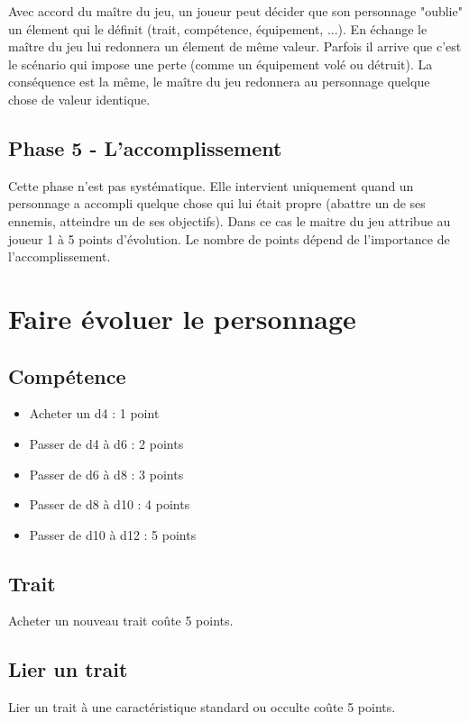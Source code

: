 \begin{multicols}{2}
Avec accord du maître du jeu, un joueur peut décider que son personnage "oublie" un élement qui le définit (trait, compétence, équipement, ...). En échange le maître du jeu lui redonnera un élement de même valeur. Parfois il arrive que c'est le scénario qui impose une perte (comme un équipement volé ou détruit). La conséquence est la même, le maître du jeu redonnera au personnage quelque chose de valeur identique.

\subsection{Phase 5 - L'accomplissement}

Cette phase n'est pas systématique. Elle intervient uniquement quand un personnage a accompli quelque chose qui lui était propre (abattre un de ses ennemis, atteindre un de ses objectifs). Dans ce cas le maitre du jeu attribue au joueur 1 à 5 points d'évolution. Le nombre de points dépend de l'importance de l'accomplissement.

\section{Faire évoluer le personnage}

\subsection{Compétence}

\begin{itemize}
\item Acheter un d4 : 1 point
\item Passer de d4 à d6 : 2 points
\item Passer de d6 à d8 : 3 points
\item Passer de d8 à d10 : 4 points
\item Passer de d10 à d12 : 5 points
\end{itemize}

\subsection{Trait}

Acheter un nouveau trait coûte 5 points.

\subsection{Lier un trait}

Lier un trait à une caractéristique standard ou occulte coûte 5 points.


\end{multicols}
